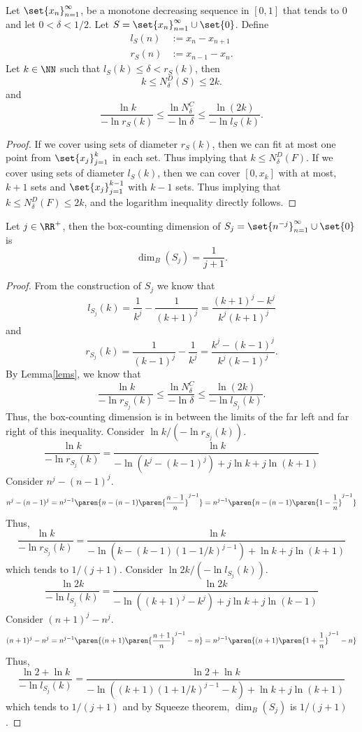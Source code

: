 \begin{lemma}\label{lems}
	Let $\set{x_n}_{n=1}^\infty$, be a monotone decreasing sequence in $[0,1]$ that tends to 0 and let $0 < \delta < 1/2$.
	Let $S=\set{x_n}_{n=1}^\infty\cup\set{0}$.
	Define
	\begin{align*}
		l_S(n)&:= x_n-x_{n+1}\\
		r_S(n)&:= x_{n-1}-x_n.
	\end{align*}
	Let $k\in\NN$ such that $l_S(k)\leq \delta < r_S(k)$, then
	\[
		k \leq N^D_\delta(S)\leq 2k.
	\]
	and
	\[
		\frac{\ln k}{-\ln r_S(k)}\leq \frac{\ln N^C_\delta}{-\ln\delta}\leq\frac{\ln (2k)}{-\ln l_S(k)}.
	\]
\end{lemma}
\begin{proof}
	If we cover using sets of diameter $r_S(k)$, then we can fit at most one point from $\set{x_j}_{j=1}^k$ in each set.
	Thus implying that $k\leq N^D_\delta(F)$.
	If we cover using sets of diameter $l_S(k)$, then we can cover $[0,x_k]$ with at most, $k+1$ sets and $\set{x_j}_{j=1}^{k-1}$ with $k-1$ sets.
	Thus implying that $k\leq N^D_\delta(F)\leq 2k$, and the logarithm inequality directly follows.
\end{proof}

\begin{example}
	Let $j\in\RR^+$, then the box-counting dimension of $S_j=\set{n^{-j}}_{n=1}^\infty\cup\set{0}$ is
	\[
		\dim_B(S_j)=\frac{1}{j+1}.
	\]
\end{example}
\begin{proof}
	From the construction of $S_j$ we know that
	\[
		l_{S_j}(k) = \frac{1}{k^j}-\frac{1}{(k+1)^j} = \frac{(k+1)^j-k^j}{k^j(k+1)^j}
	\]
	and
	\[
		r_{S_j}(k) = \frac{1}{(k-1)^j}-\frac{1}{k^j} = \frac{k^j-(k-1)^j}{k^j(k-1)^j}.
	\]
	By Lemma\autoref{lems}, we know that
	\[
		\frac{\ln k}{-\ln r_{S_j}(k)}\leq \frac{\ln N^C_\delta}{-\ln\delta}\leq\frac{\ln (2k)}{-\ln l_{S_j}(k)}.
	\]
	Thus, the box-counting dimension is in between the limits of the far left and far right of this inequality.
	Consider $\ln k/(-\ln r_{S_j}(k))$.
	\[
		\frac{\ln k}{-\ln r_{S_j}(k)}=\frac{\ln k}{-\ln (k^j-(k-1)^j)+j\ln k +j\ln(k+1)}
	\]
	Consider $n^j-(n-1)^j$.
	\[
		n^j-(n-1)^j=n^{j-1}\paren{ n - (n-1)\paren{\frac{n-1}{n}}^{j-1} }=n^{j-1}\paren{ n - (n-1)\paren{1-\frac{1}{n}}^{j-1} }
	\]
	Thus,
	\[
		\frac{\ln k}{-\ln r_{S_j}(k)}=\frac{\ln k}{-\ln(k-(k-1)(1-1/k)^{j-1})+\ln k +j\ln(k+1)}
	\]
	which tends to $1/(j+1)$.
	Consider $\ln 2k/(-\ln l_{S_j}(k))$.
	\[
		\frac{\ln 2k}{-\ln l_{S_j}(k)}=\frac{\ln 2k}{-\ln ((k+1)^j-k^j)+j\ln k +j\ln(k-1)}
	\]
	Consider $(n+1)^j-n^j$.
	\[
		(n+1)^j-n^j=n^{j-1}\paren{ (n+1)\paren{\frac{n+1}{n}}^{j-1} - n }=n^{j-1}\paren{ (n+1)\paren{1+\frac{1}{n}}^{j-1} - n }
	\]
	Thus,
	\[
		\frac{\ln 2 +\ln k}{-\ln l_{S_j}(k)}=\frac{\ln 2+\ln k}{-\ln((k+1)(1+1/k)^{j-1}-k)+\ln k +j\ln(k+1)}
	\]
	which tends to $1/(j+1)$ and by Squeeze theorem, $\dim_B(S_j)$ is $1/(j+1)$.
\end{proof}

